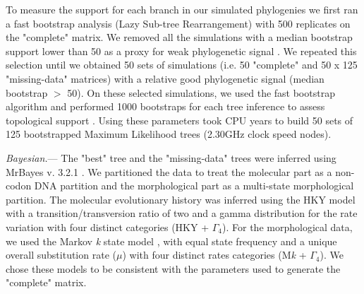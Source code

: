 \documentclass[12pt,letterpaper]{article}
\renewcommand{\subsubsection}[1]{%
\vspace{2ex}
\noindent
\textit{#1.}---}
\begin{document}
To measure the support for each branch in our simulated phylogenies
we first ran a fast bootstrap analysis (Lazy Sub-tree Rearrangement) with 500 replicates on the "complete" matrix. We removed all the simulations with a median bootstrap support lower than 50 as a proxy for weak phylogenetic signal \citep{zanderminimal2004}. We repeated this selection until we obtained 50 sets of simulations (i.e. 50 "complete" and 50 x 125 "missing-data" matrices) with a relative good phylogenetic signal (median bootstrap $>$ 50). On these selected simulations, we used the fast bootstrap algorithm and performed 1000 bootstraps for each tree inference to assess topological support \citep{pattengale2010many}. Using these parameters took  CPU years to build 50 sets of 125 bootstrapped Maximum Likelihood trees (2.30GHz clock speed nodes).

\subsubsection{Bayesian}
The "best" tree and the "missing-data" trees were inferred using MrBayes v. 3.2.1 \citep{Ronquist2012mrbayes}. We partitioned the data to treat the molecular part as a non-codon DNA partition and the morphological part as a multi-state morphological partition. The molecular evolutionary history was inferred using the HKY model with a transition/transversion ratio of two \citep{douadycomparison2003} and a gamma distribution for the rate variation with four distinct categories (HKY + $\Gamma_4$). For the morphological data, we used the Markov \textit{k} state model \citep{lewisa2001}, with equal state frequency and a unique overall substitution rate ($\mu$) with four distinct rates categories (M\textit{k} + $\Gamma_4$). We chose these models to be consistent with the parameters used to generate the "complete" matrix.
\end{document}
